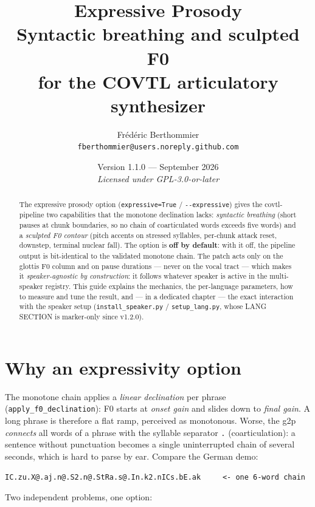 \documentclass[11pt,a4paper]{article}
\title{\vspace{-1cm}\Huge\bfseries\color{blue!50!black} Expressive Prosody\\[0.3em]
\Large\mdseries\color{black!70} Syntactic breathing and sculpted F0\\
for the COVTL articulatory synthesizer}
\author{\large Frédéric Berthommier\\[0.3em]
\small\texttt{fberthommier@users.noreply.github.com}}
\date{\small Version 1.1.0 --- September 2026\\[0.2em]
\textit{Licensed under GPL-3.0-or-later}}
\newcommand{\ks}[1]{\texttt{#1}}
\begin{document}
\maketitle
\thispagestyle{fancy}

\begin{abstract}
\noindent
The expressive prosody option (\texttt{expressive=True} /
\texttt{-{}-expressive}) gives the covtl-pipeline two
capabilities that the monotone declination lacks: \emph{syntactic
breathing} (short pauses at chunk boundaries, so no chain of
coarticulated words exceeds five words) and a \emph{sculpted F0
contour} (pitch accents on stressed syllables, per-chunk attack
reset, downstep, terminal nuclear fall). The option is
\textbf{off by default}: with it off, the pipeline output is
bit-identical to the validated monotone chain. The patch acts only
on the glottis F0 column and on pause durations --- never on the
vocal tract --- which makes it \emph{speaker-agnostic by
construction}: it follows whatever speaker is active in the
multi-speaker registry. This guide explains the mechanics, the
per-language parameters, how to measure and tune the result, and ---
in a dedicated chapter --- the exact interaction with the speaker
setup (\texttt{install\_speaker.py} /
\texttt{setup\_lang.py}, whose LANG SECTION is marker-only
since v1.2.0).
\end{abstract}

\tableofcontents

\section{Why an expressivity option}\label{sec:why}

The monotone chain applies a \emph{linear declination} per phrase
(\texttt{apply\_f0\_declination}): F0 starts at \emph{onset gain}
and slides down to \emph{final gain}. A long phrase is therefore a
flat ramp, perceived as monotonous. Worse, the g2p
\emph{connects} all words of a phrase with the syllable separator
\ks{.} (coarticulation): a sentence without punctuation becomes a
single uninterrupted chain of several seconds, which is hard to
parse by ear. Compare the German demo:

\begin{lstlisting}[style=verbatim]
IC.zu.X@.aj.n@.S2.n@.StRa.s@.In.k2.nICs.bE.ak     <- one 6-word chain
\end{lstlisting}

Two independent problems, one option:
\end{document}
